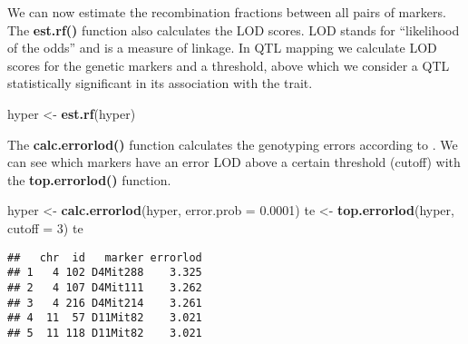 \documentclass[12pt,]{krantz}
\newenvironment{Shaded}{\begin{snugshade}}{\end{snugshade}}
\newcommand{\KeywordTok}[1]{\textcolor[rgb]{0.27,0.27,0.27}{\textbf{{#1}}}}
\newcommand{\DataTypeTok}[1]{\textcolor[rgb]{0.27,0.27,0.27}{{#1}}}
\newcommand{\DecValTok}[1]{\textcolor[rgb]{0.06,0.06,0.06}{{#1}}}
\newcommand{\FloatTok}[1]{\textcolor[rgb]{0.06,0.06,0.06}{{#1}}}
\newcommand{\StringTok}[1]{\textcolor[rgb]{0.5,0.5,0.5}{{#1}}}
\newcommand{\OtherTok}[1]{\textcolor[rgb]{0.37,0.37,0.37}{{#1}}}
\newcommand{\NormalTok}[1]{{#1}}
\begin{document}
We can now estimate the recombination fractions between all pairs of
markers. The \textbf{est.rf()} function also calculates the LOD scores.
LOD stands for ``likelihood of the odds'' and is a measure of linkage.
In QTL mapping we calculate LOD scores for the genetic markers and a
threshold, above which we consider a QTL statistically significant in
its association with the trait.

\begin{Shaded}
\begin{Highlighting}[]
\NormalTok{hyper <-}\StringTok{ }\KeywordTok{est.rf}\NormalTok{(hyper)}
\end{Highlighting}
\end{Shaded}

The \textbf{calc.errorlod()} function calculates the genotyping errors
according to \citet{Lincoln1992604}. We can see which markers have an
error LOD above a certain threshold (cutoff) with the
\textbf{top.errorlod()} function.

\begin{Shaded}
\begin{Highlighting}[]
\NormalTok{hyper <-}\StringTok{ }\KeywordTok{calc.errorlod}\NormalTok{(hyper, }\DataTypeTok{error.prob =} \FloatTok{0.0001}\NormalTok{)}
\NormalTok{te <-}\StringTok{ }\KeywordTok{top.errorlod}\NormalTok{(hyper, }\DataTypeTok{cutoff =} \DecValTok{3}\NormalTok{)}
\NormalTok{te}
\end{Highlighting}
\end{Shaded}

\begin{verbatim}
##   chr  id   marker errorlod
## 1   4 102 D4Mit288    3.325
## 2   4 107 D4Mit111    3.262
## 3   4 216 D4Mit214    3.261
## 4  11  57 D11Mit82    3.021
## 5  11 118 D11Mit82    3.021
\end{verbatim}

\begin{Shaded}
\end{Shaded}
\end{document}
